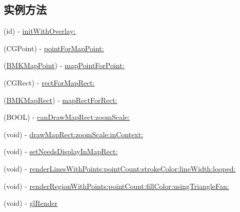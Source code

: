 \subsection*{实例方法}
\begin{DoxyCompactItemize}
\item 
(id) -\/ \hyperlink{interface_b_m_k_overlay_view_a93cdba852e915d6a417b95edabe4af4c}{init\-With\-Overlay\-:}
\item 
(C\-G\-Point) -\/ \hyperlink{interface_b_m_k_overlay_view_a211d0d55b1c10b0abca45e83f4fcf05c}{point\-For\-Map\-Point\-:}
\item 
(\hyperlink{struct_b_m_k_map_point}{B\-M\-K\-Map\-Point}) -\/ \hyperlink{interface_b_m_k_overlay_view_ab0270107a383cf49fd46d9b624604d53}{map\-Point\-For\-Point\-:}
\item 
(C\-G\-Rect) -\/ \hyperlink{interface_b_m_k_overlay_view_a4eb52fd9951bcfc898e9a026ee40e99e}{rect\-For\-Map\-Rect\-:}
\item 
(\hyperlink{struct_b_m_k_map_rect}{B\-M\-K\-Map\-Rect}) -\/ \hyperlink{interface_b_m_k_overlay_view_ae8c0f0415357f281451eaa602b3f388b}{map\-Rect\-For\-Rect\-:}
\item 
(B\-O\-O\-L) -\/ \hyperlink{interface_b_m_k_overlay_view_ad5c0685243ded79bc6657ebb7df08f87}{can\-Draw\-Map\-Rect\-:zoom\-Scale\-:}
\item 
(void) -\/ \hyperlink{interface_b_m_k_overlay_view_aad771b4c325461d99b142e79287188dc}{draw\-Map\-Rect\-:zoom\-Scale\-:in\-Context\-:}
\item 
(void) -\/ \hyperlink{interface_b_m_k_overlay_view_aca005b8bf49d57b404da473fd6f0d534}{set\-Needs\-Display\-In\-Map\-Rect\-:}
\item 
(void) -\/ \hyperlink{interface_b_m_k_overlay_view_a67fcc048446dfa1725aa4a86b241b282}{render\-Lines\-With\-Points\-:point\-Count\-:stroke\-Color\-:line\-Width\-:looped\-:}
\item 
(void) -\/ \hyperlink{interface_b_m_k_overlay_view_a85a054df49b09373b036e22771138ba2}{render\-Region\-With\-Points\-:point\-Count\-:fill\-Color\-:using\-Triangle\-Fan\-:}
\item 
(void) -\/ \hyperlink{interface_b_m_k_overlay_view_a0a851a886a4bb7268ea595d3892ab59f}{gl\-Render}
\end{DoxyCompactItemize}
